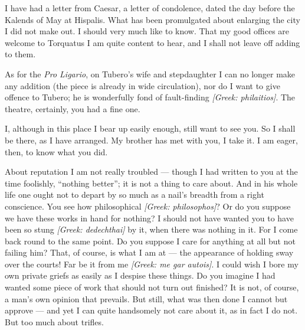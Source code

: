 

 I have had a letter from Caesar, a letter of condolence, dated the day before the Kalends of May at Hispalis. What has been promulgated about enlarging the city I did not make out. I should very much like to know. That my good offices are welcome to Torquatus I am quite content to hear, and I shall not leave off adding to them.

 As for the \textit{Pro Ligario}, on Tubero's wife and stepdaughter I can no longer make any addition (the piece is already in wide circulation), nor do I want to give offence to Tubero; he is wonderfully fond of fault-finding \textit{[Greek: philaitios]}. The theatre, certainly, you had a fine one.

 I, although in this place I bear up easily enough, still want to see you. So I shall be there, as I have arranged. My brother has met with you, I take it. I am eager, then, to know what you did.

 About reputation I am not really troubled --- though I had written to you at the time foolishly, ``nothing better''; it is not a thing to care about. And in his whole life one ought not to depart by so much as a nail's breadth from a right conscience. You see how philosophical \textit{[Greek: philosophos]}? Or do you suppose we have these works in hand for nothing? I should not have wanted you to have been so stung \textit{[Greek: dedechthai]} by it, when there was nothing in it. For I come back round to the same point. Do you suppose I care for anything at all but not failing him? That, of course, is what I am at --- the appearance of holding sway over the courts! Far be it from me \textit{[Greek: me gar autois]}. I could wish I bore my own private griefs as easily as I despise these things. Do you imagine I had wanted some piece of work that should not turn out finished? It is not, of course, a man's own opinion that prevails. But still, what was then done I cannot but approve --- and yet I can quite handsomely not care about it, as in fact I do not. But too much about trifles.
